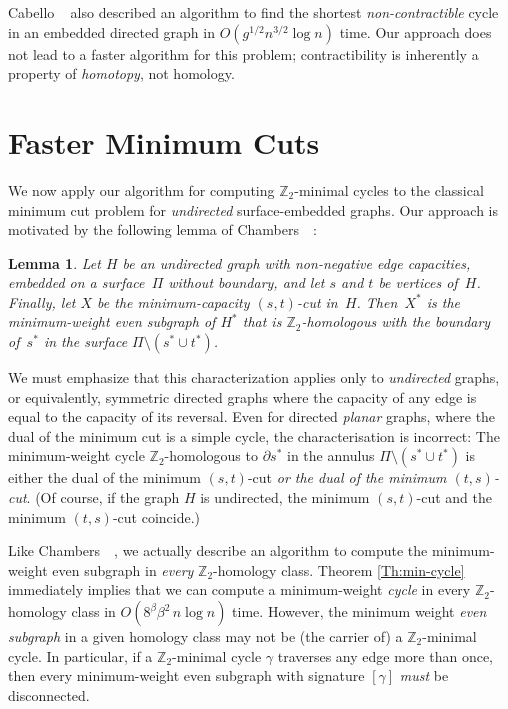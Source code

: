 \documentclass[twoside,leqno,twocolumn]{article}
\def\Z{\mathbb{Z}}
\newtheorem{lemma}[theorem]{Lemma}
\begin{document}
{Cabello \etal~\cite{ccl-fsncd-10} also described an algorithm to find the shortest \emph{non-contractible} cycle in an embedded directed graph in $O(g^{1/2} n^{3/2}\log n)$ time.  Our approach does not lead to a faster algorithm for this problem;  contractibility is inherently  a property of \emph{homotopy}, not homology.

\section{Faster Minimum Cuts}
\label{S:mincut}

We now apply our algorithm for computing $\Z_2$-minimal cycles to the classical minimum cut problem for \emph{undirected} surface-embedded graphs.  Our approach is motivated by the following lemma of Chambers~\etal~\cite[Lemma 3.1]{surfcut}:

\begin{lemma}
\label{L:mincut-z2}
Let $H$ be an undirected graph with non-negative edge capacities, embedded on a surface~$\Pi$ without boundary, and let $s$ and $t$ be vertices of~$H$.  Finally, let $X$ be the minimum-capacity $(s,t)$-cut in~$H$.  Then~$X^*$ is the minimum-weight even subgraph of $H^*$ that is $\Z_2$-homologous with the boundary of~$s^*$ in the surface $\Pi\setminus(s^*\cup t^*)$.
\end{lemma}

We must emphasize that this characterization applies only to \emph{undirected} graphs, or equivalently, symmetric directed graphs where the capacity of any edge is equal to the capacity of its reversal.  Even for directed \emph{planar} graphs, where the dual of the minimum cut is a simple cycle, the characterisation is incorrect: The minimum-weight cycle $\Z_2$-homologous to $\partial s^*$ in the annulus $\Pi\setminus(s^*\cup t^*)$ is either the dual of the minimum $(s,t)$-cut \emph{or the dual of the minimum $(t,s)$-cut}.  (Of course, if the graph $H$ is undirected, the minimum $(s,t)$-cut and the minimum $(t,s)$-cut coincide.)

\medskip
Like Chambers~\etal~\cite{surfcut}, we actually describe an algorithm to compute the minimum-weight even subgraph in \emph{every} $\Z_2$-homology class.  Theorem \ref{Th:min-cycle} immediately implies that we can compute a minimum-weight \emph{cycle} in every $\Z_2$-homology class in $O(8^\beta \beta^2\, n\log n)$ time.  However, the minimum weight \emph{even subgraph} in a given homology class may not be (the carrier of) a $\Z_2$-minimal cycle.  In particular, if a $\Z_2$-minimal cycle $\gamma$ traverses any edge more than once, then every minimum-weight even subgraph with signature $[\gamma]$ \emph{must} be disconnected.

}
\end{document}
